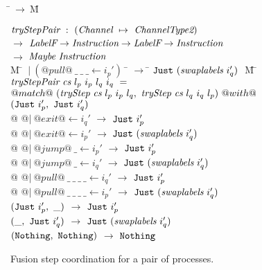
\begin{figure}
\begin{tabbing}
\=$~\to~$\=M\kill

$\textit{tryStepPair} ~:~ (\textit{Channel} ~\mapsto~ \textit{ChannelType2})$ \\
\> $\to$ \> $\textit{LabelF} \to \textit{Instruction} \to \textit{LabelF} \to \textit{Instruction}$ \\
\> $\to$ \> $\textit{Maybe}~\textit{Instruction}$ \\

M \= $~|~(@pull@~\_~\_~\_ \gets i_p')~$ \= $\to$ \= $\texttt{Just}~ (\textit{swaplabels}~i_q')~$ \= M \=\kill
$\textit{tryStepPair} ~\textit{cs}~l_p~i_p~l_q~i_q~=$ \\
\> $@match@~ (\textit{tryStep}~\textit{cs}~l_p~i_p~l_q,~\textit{tryStep}~\textit{cs}~l_q~i_q~l_p) ~@with@$ \\
\> $(\texttt{Just}~ i_p',~\texttt{Just}~ i_q')$ \\

\> @ @$|~@exit@ \gets i_q'$ \> $\to$ \> $\texttt{Just}~ i_p'$
\>  \\[0.5ex]

\> @ @$|~@exit@ \gets i_p'$ \> $\to$ \> $\texttt{Just}~ (\textit{swaplabels}~i_q')$
\>  \\[0.5ex]

\> @ @$|~@jump@~\_ \gets i_p'$ \> $\to$ \> $\texttt{Just}~ i_p'$
\>  \\[0.5ex]

\> @ @$|~@jump@~\_ \gets i_q'$ \> $\to$ \> $\texttt{Just}~ (\textit{swaplabels}~i_q')$
\>  \\[0.5ex]

\> @ @$|~@pull@~\_~\_~\_~\_ \gets i_q'$ \> $\to$ \> $\texttt{Just}~ i_p'$
\>  \\[0.5ex]

\> @ @$|~@pull@~\_~\_~\_~\_ \gets i_p'$ \> $\to$ \> $\texttt{Just}~ (\textit{swaplabels}~i_q')$
\>  \\[0.5ex]

\> $(\texttt{Just}~ i_p',~\_)$ \> $\to$ \> $\texttt{Just}~ i_p'$
\>  \\[0.5ex]

\> $(\_, ~\texttt{Just}~ i_q')$ \> $\to$ \> $\texttt{Just}~ (\textit{swaplabels}~i_q')$
\>  \\[0.5ex]

\> $(\texttt{Nothing}, ~\texttt{Nothing})$ \> $\to$ \> $\texttt{Nothing}$
\> 
\end{tabbing}
\caption{Fusion step coordination for a pair of processes.}
\label{fig:Fusion:Def:StepPair}
\end{figure}
